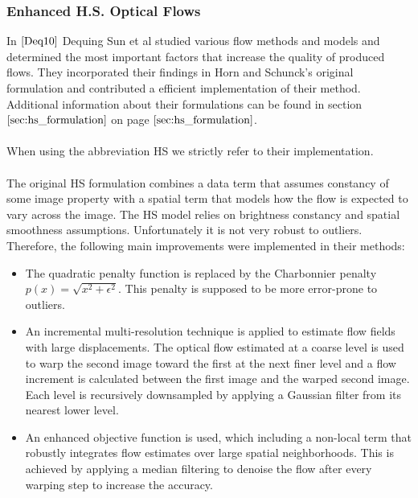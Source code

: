 \subsubsection{Enhanced H.S. Optical Flows}
In $\cite{Deq10}$ Dequing Sun et al studied various flow methods and models and determined the most important factors that increase the quality of produced flows. They incorporated their findings in Horn and Schunck's original formulation and contributed a efficient implementation of their method. Additional information about their formulations can be found in section $\ref{sec:hs_formulation}$ on page $\pageref{sec:hs_formulation}$. \\ \\
When using the abbreviation HS we strictly refer to their implementation. \\ \\
The original HS formulation combines a data term that assumes constancy of some image property with a spatial term that models how the flow is expected to vary across the image. The HS model relies on brightness constancy and spatial smoothness assumptions. Unfortunately it is not very robust to outliers. Therefore, the following main improvements were implemented in their methods:
\begin{itemize}
  \item The quadratic penalty function is replaced by the Charbonnier penalty $p\left( x \right) = \sqrt{x^2 + \epsilon^2}$. This penalty is supposed to be more error-prone to outliers.
  \item An incremental multi-resolution technique is applied to estimate flow fields with large displacements. The optical flow estimated at a coarse level is used to warp the second image toward the first at the next finer level and a flow increment is calculated between the first image and the warped second image. Each level is recursively downsampled by applying a Gaussian filter from its nearest lower level.
  \item An enhanced objective function is used, which including a non-local term that robustly integrates flow estimates over large spatial neighborhoods. This is achieved by applying a median filtering to denoise the flow after every warping step to increase the accuracy.
\end{itemize}

